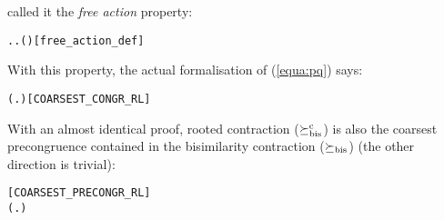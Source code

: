  called it the \emph{free action} property:
\begin{alltt}
  \HOLSymConst{\HOLTokenDefEquality{}} \HOLSymConst{\HOLTokenExists{}}. \HOLSymConst{\HOLTokenForall{}}. \HOLSymConst{\HOLTokenNeg{}}( \HOLTokenWeakTransBegin{} \HOLTokenImp{} )\hfill{[free_action_def]}
\end{alltt}
%
With this property, the actual formalisation of (\ref{equa:pq}) says:
\begin{alltt}
\HOLTokenTurnstile{}   \HOLSymConst{\HOLTokenConj{}}   \HOLSymConst{\HOLTokenImp{}} (\HOLSymConst{\HOLTokenForall{}}.  \HOLSymConst{\ensuremath{+}}  \HOLSymConst{\HOLTokenWeakEQ}  \HOLSymConst{\ensuremath{+}} ) \HOLSymConst{\HOLTokenImp{}}  \HOLSymConst{\HOLTokenObsCongr} \hfill{[COARSEST_CONGR_RL]}
\end{alltt}

With an almost identical proof, rooted contraction
($\mathrel{\succeq^{\rm{c}}_{\rm{bis}}}$) is also the coarsest
precongruence contained in the bisimilarity contraction ($\mathrel{\succeq_{\rm{bis}}}$)
(the other direction is trivial):
\vspace{-2ex}
\begin{alltt}
\hfill{[COARSEST_PRECONGR_RL]}
\HOLTokenTurnstile{}   \HOLSymConst{\HOLTokenConj{}}   \HOLSymConst{\HOLTokenImp{}} (\HOLSymConst{\HOLTokenForall{}}.  \HOLSymConst{\ensuremath{+}}  \HOLSymConst{\HOLTokenContracts{}}  \HOLSymConst{\ensuremath{+}} ) \HOLSymConst{\HOLTokenImp{}}  \HOLSymConst{\HOLTokenObsContracts} 
\end{alltt}


